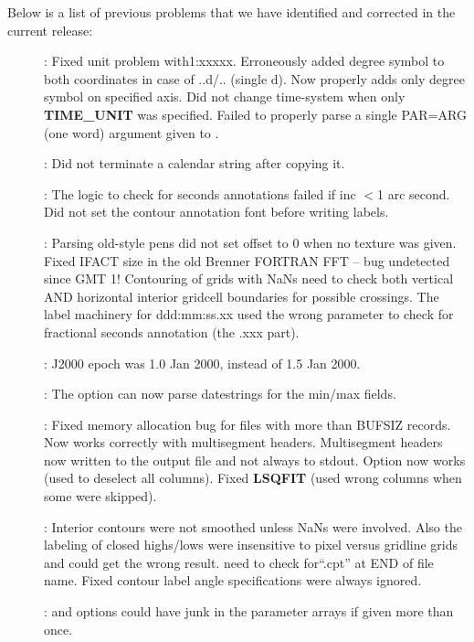 Below is a list of previous problems that we have identified and corrected in the current release:

\begin{description}
\item []: Fixed unit problem with1:xxxxx.  Erroneously added degree symbol
to both coordinates in case of ..d/.. (single d). Now properly adds only degree symbol on specified axis.
Did not change time-system when only {\bf TIME\_UNIT} was specified.  Failed to properly parse a single PAR=ARG
(one word) argument given  to .
\item []: Did not terminate a calendar string after copying it.
\item []: The logic to check for seconds annotations failed if inc $<$1 arc second.
Did not set the contour annotation font before writing labels.
\item []: Parsing old-style pens did not set offset to 0 when no texture was given.
Fixed IFACT size in the old Brenner FORTRAN FFT -- bug undetected since GMT 1!
Contouring of grids with NaNs need to check both vertical AND horizontal interior gridcell boundaries
for possible crossings.  The label machinery for ddd:mm:ss.xx used the wrong parameter to check
for fractional seconds annotation (the .xxx part).
\item []: J2000 epoch was 1.0 Jan 2000, instead of 1.5 Jan 2000.
\item []: The  option can now parse datestrings for the min/max fields.
\item []: Fixed memory allocation bug for files with more than BUFSIZ records.
Now works correctly with multisegment headers.  Multisegment headers now written to the output file
and not always to stdout. Option  now works (used to deselect all columns).
Fixed {\bf LSQFIT} (used wrong columns when some were skipped).
\item []: Interior contours were not smoothed unless NaNs were involved.  Also the
labeling of closed highs/lows were insensitive to pixel versus gridline grids and could get the wrong result.
 need to check for``.cpt'' at END of file name.  Fixed contour label angle specifications were always ignored.
\item []:  and  options could have junk in the parameter arrays if given more than once.

\end{description}
